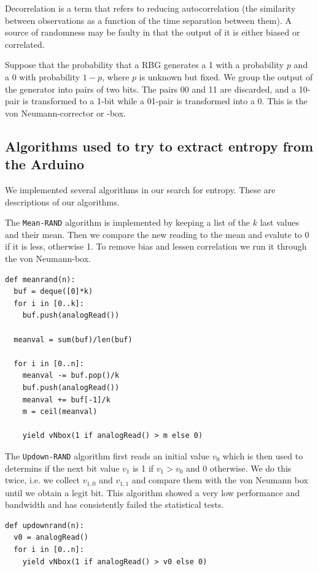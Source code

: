 \documentclass[a4paper]{article}           %
\begin{document}
Decorrelation is a term that refers to reducing autocorrelation (the similarity between observations as a function of the time separation between them). A source of randomness may be faulty in that the output of it is either biased or correlated. 

Suppose that the probability that a RBG generates a 1 with a probability $p$ and a 0 with probability $1-p$, where $p$ is unknown but fixed. We group the output of the generator into pairs of two bits. The pairs 00 and 11 are discarded, and a 10-pair is transformed to a 1-bit while a 01-pair is transformed into a 0. This is the von Neumann-corrector\cite{menezes1996, intel} or -box. 

\subsection{Algorithms used to try to extract entropy from the Arduino}
\label{sec:algs}

We implemented several algorithms in our search for entropy. These are descriptions of our algorithms. 

The \texttt{Mean-RAND} algorithm is implemented by keeping a list of the $k$ last values and their mean. Then we compare the new reading to the mean and evalute to 0 if it is less, otherwise 1. To remove bias and lessen correlation we run it through the von Neumann-box. 

\begin{lstlisting}[caption=The \texttt{Mean-RAND} algorithm in Python-ish pseudocode]
def meanrand(n):
  buf = deque([0]*k)
  for i in [0..k]:
    buf.push(analogRead())

  meanval = sum(buf)/len(buf)

  for i in [0..n]:
    meanval -= buf.pop()/k
    buf.push(analogRead())
    meanval += buf[-1]/k
    m = ceil(meanval)

    yield vNbox(1 if analogRead() > m else 0)
  \end{lstlisting}

The \texttt{Updown-RAND} algorithm first reads an initial value $v_0$ which is then used to determins if the next bit value $v_1$ is 1 if $v_1 > v_0$ and 0 otherwise. We do this twice, i.e. we collect $v_{1,0}$ and $v_{1,1}$ and compare them with the von Neumann box until we obtain a legit bit. This algorithm showed a very low performance and bandwidth and has consistently failed the statistical tests. 

\begin{lstlisting}[caption=The \texttt{Updown-RAND} algorithm]
def updownrand(n):
  v0 = analogRead()
  for i in [0..n]:
    yield vNbox(1 if analogRead() > v0 else 0)
\end{lstlisting}
\end{document}
